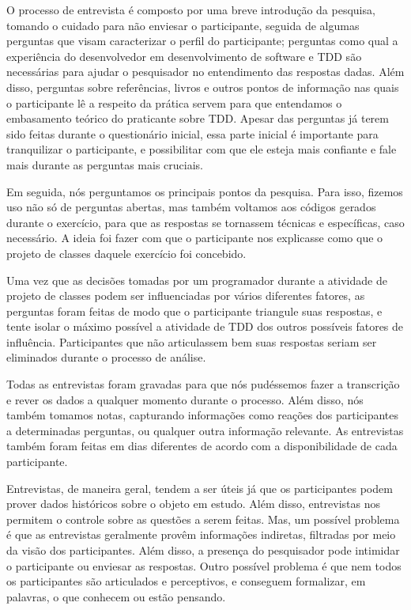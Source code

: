 O processo de entrevista é composto por uma breve introdução da pesquisa, tomando
o cuidado para não enviesar o participante, seguida de algumas perguntas que visam
caracterizar o perfil do participante; perguntas como qual a experiência do
desenvolvedor em desenvolvimento de software e TDD são necessárias para ajudar o
pesquisador no entendimento das respostas dadas. Além disso, perguntas sobre
referências, livros e outros pontos de informação nas quais o participante lê a
respeito da prática servem para que entendamos o embasamento teórico
do praticante sobre TDD. Apesar das perguntas já terem sido feitas durante
o questionário inicial, essa parte inicial é importante para tranquilizar
o participante, e possibilitar com que ele esteja mais confiante e fale
mais durante as perguntas mais cruciais.

Em seguida, nós perguntamos os principais pontos da pesquisa.
Para isso, fizemos uso não só de perguntas abertas, mas também
voltamos aos códigos gerados durante o exercício, para que as respostas se tornassem técnicas e
específicas, caso necessário. A ideia foi fazer com que o participante nos explicasse
como que o projeto de classes daquele exercício foi concebido.

Uma vez que as decisões tomadas por um programador durante a atividade de projeto de classes
podem ser influenciadas por vários diferentes fatores, 
as perguntas foram feitas de modo que o participante triangule suas respostas,
e tente isolar o máximo possível a atividade de TDD dos outros possíveis fatores
de influência. Participantes que não articulassem bem suas respostas seriam ser eliminados
durante o processo de análise.

Todas as entrevistas foram gravadas para que nós pudéssemos fazer a
transcrição e rever os dados a qualquer momento durante o processo. Além disso,
nós também tomamos notas, capturando informações como reações dos 
participantes a determinadas perguntas, ou qualquer outra informação relevante. 
As entrevistas também foram feitas em dias diferentes de acordo com a disponibilidade
de cada participante.

Entrevistas, de maneira geral, tendem a ser úteis já que os participantes podem prover dados históricos 
sobre o objeto em estudo.
Além disso, entrevistas nos permitem o controle sobre as questões a serem feitas.
Mas, um possível problema é que as entrevistas geralmente provêm informações indiretas, 
filtradas por meio da visão dos participantes. Além disso, a presença do pesquisador pode 
intimidar o participante ou enviesar as respostas.
Outro possível problema é que nem todos os participantes são articulados e perceptivos, e conseguem
formalizar, em palavras, o que conhecem ou estão pensando.


